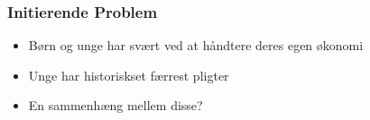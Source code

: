 
\begin{frame}
\frametitle{Initierende Problem}
    \begin{itemize}
        \item{Børn og unge har svært ved at håndtere deres egen økonomi}
        \item{Unge har historiskset færrest pligter}
        \item{En sammenhæng mellem disse?}
        
    \end{itemize}
\end{frame}

